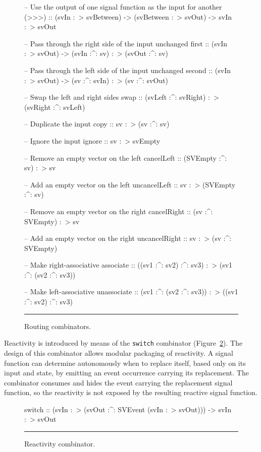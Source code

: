 \documentclass[draft]{llncs}
\begin{document}
\begin{figure}
\begin{code}
-- Use the output of one signal function as the input for another
(>>>) :: (svIn :~> svBetween) -> (svBetween :~> svOut) -> svIn :~> svOut

-- Pass through the right side of the input unchanged
first :: (svIn :~> svOut) -> (svIn :^: sv) :~> (svOut :^: sv)

-- Pass through the left side of the input unchanged
second :: (svIn :~> svOut) -> (sv :^: svIn) :~> (sv :^: svOut)

-- Swap the left and right sides
swap :: (svLeft :^: svRight) :~> (svRight :^: svLeft)

-- Duplicate the input
copy :: sv :~> (sv :^: sv)

-- Ignore the input
ignore :: sv :~> svEmpty

-- Remove an empty vector on the left
cancelLeft :: (SVEmpty :^: sv) :~> sv

-- Add an empty vector on the left
uncancelLeft :: sv :~> (SVEmpty :^: sv)

-- Remove an empty vector on the right
cancelRight :: (sv :^: SVEmpty) :~> sv

-- Add an empty vector on the right
uncancelRight :: sv :~> (sv :^: SVEmpty)

-- Make right-associative
associate :: ((sv1 :^: sv2) :^: sv3) :~> (sv1 :^: (sv2 :^: sv3))

-- Make left-associative
unassociate :: (sv1 :^: (sv2 :^: sv3)) :~> ((sv1 :^: sv2) :^: sv3)
\end{code}
\hrule
\caption{Routing combinators.}
\label{figure:routing_combinators}
\end{figure}

Reactivity is introduced by means of the {\tt switch} combinator
(Figure~\ref{figure:switch_combinator}). The design of this combinator
allows modular packaging of reactivity. A signal function can determine
autonomously when to replace itself, based only on its input and state,
by emitting an event occurrence carrying its replacement. The combinator
consumes and hides the event carrying the replacement signal function, 
so the reactivity is not exposed by the resulting reactive signal function.

\begin{figure}
\begin{code}
switch ::    (svIn :~> (svOut :^: SVEvent (svIn :~> svOut)))
          -> svIn :~> svOut
\end{code}
\hrule
\caption{Reactivity combinator.}
\label{figure:switch_combinator}
\end{figure}
\end{document}
